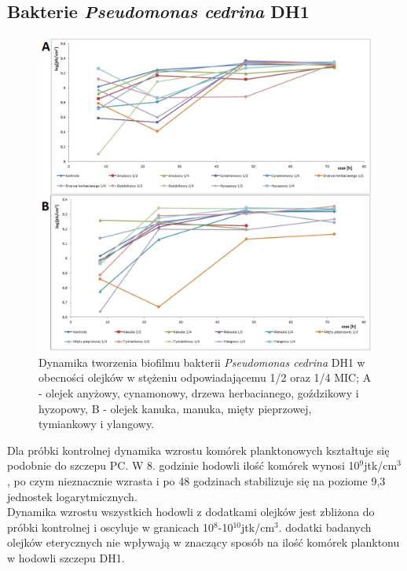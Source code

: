 \documentclass[11pt,a4paper]{report}
\begin{document}
\clearpage

\subsection{Bakterie \textit{Pseudomonas cedrina} DH1}


\begin{figure}[!h]
\begin{center}
\includegraphics[scale=0.55]{img/dh1-c.png}
\caption{Dynamika tworzenia biofilmu bakterii \textit{Pseudomonas cedrina} DH1 w obecności olejków w stężeniu odpowiadającemu 1/2 oraz 1/4 MIC; A - olejek anyżowy, cynamonowy, drzewa herbacianego, goździkowy i hyzopowy, B - olejek kanuka, manuka, mięty pieprzowej, tymiankowy i ylangowy.}\label{dh1-c}
\end{center} 
\end{figure}

\clearpage
Dla próbki kontrolnej dynamika wzrostu komórek planktonowych kształtuje się podobnie do szczepu PC. W 8. godzinie hodowli ilość komórek wynosi 10$^9$jtk/cm$^3$, po czym nieznacznie wzrasta i po 48 godzinach stabilizuje się na poziome 9,3 jednostek logarytmicznych.\\
Dynamika wzrostu wszystkich hodowli z dodatkami olejków jest zbliżona do próbki kontrolnej i oscyluje w granicach 10$^8$-10$^10$jtk/cm$^3$. dodatki badanych olejków eterycznych nie wpływają w znaczący sposób na ilość komórek planktonu w hodowli szczepu DH1.
\clearpage
\end{document}
